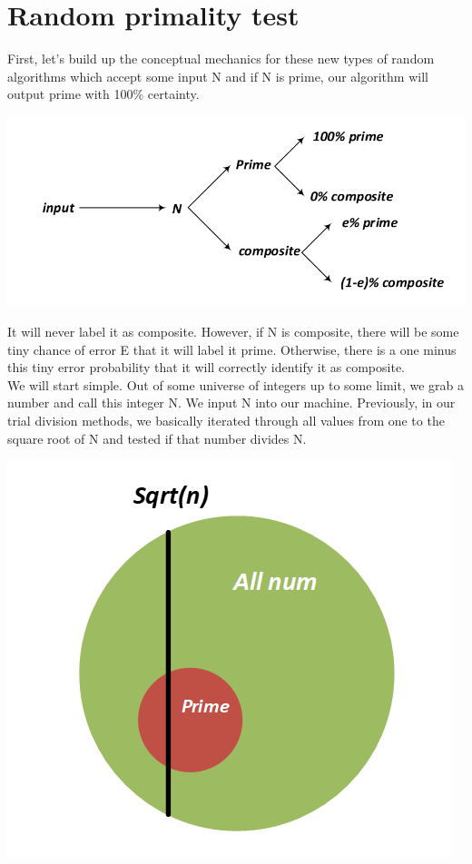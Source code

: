 \documentclass{report}
\begin{document}
\section{Random primality test}
First, let's build up the conceptual mechanics for these new types of random algorithms which accept some input N and if N is prime, our algorithm will output prime with 100\% certainty.
 \begin{center}
	\includegraphics[scale=1]{81.png}
\end{center}
 It will never label it as composite. However, if N is composite, there will be some tiny chance of error E that it will label it prime. Otherwise, there is a one minus this tiny error probability that it will correctly identify it as composite.\\
We will start simple. Out of some universe of integers up to some limit, we grab a number and call this integer N. We input N into our machine. Previously, in our trial division methods, we basically iterated through all values from one to the square root of N and tested if that number divides N. 
 \begin{center}
	\includegraphics[scale=1]{82.png}
\end{center}
\end{document}
